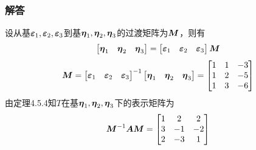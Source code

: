 \documentclass{beamer}
\begin{document}
\begin{frame}
    \frametitle{解答}
    设从基\(\boldsymbol{\varepsilon}_1,\boldsymbol{\varepsilon}_2,\boldsymbol{\varepsilon}_3\)到基\(\boldsymbol{\eta}_1,\boldsymbol{\eta}_2,\boldsymbol{\eta}_3\)的过渡矩阵为\(\boldsymbol{M}\)，则有
    \begin{equation*}
        \begin{bmatrix}\boldsymbol{\eta}_1&\boldsymbol{\eta}_2&\boldsymbol{\eta}_3\end{bmatrix}=
        \begin{bmatrix}\boldsymbol{\varepsilon}_1&\boldsymbol{\varepsilon}_2&\boldsymbol{\varepsilon}_3\end{bmatrix}\boldsymbol{M}
    \end{equation*}
    \begin{equation*}
        \boldsymbol{M}={\begin{bmatrix}\boldsymbol{\varepsilon}_1&\boldsymbol{\varepsilon}_2&\boldsymbol{\varepsilon}_3\end{bmatrix}}^{-1}\begin{bmatrix}\boldsymbol{\eta}_1&\boldsymbol{\eta}_2&\boldsymbol{\eta}_3\end{bmatrix}=
        \begin{bmatrix}
            1 & 1 & -3 \\
            1 & 2 & -5 \\
            1 & 3 & -6
        \end{bmatrix}
    \end{equation*}
    由定理4.5.4知\(T\)在基\(\boldsymbol{\eta}_1,\boldsymbol{\eta}_2,\boldsymbol{\eta}_3\)下的表示矩阵为
    \begin{equation*}
        {\boldsymbol{M}}^{-1}\boldsymbol{A}\boldsymbol{M}=
        \begin{bmatrix}
            1 & 2  & 2  \\
            3 & -1 & -2 \\
            2 & -3 & 1
        \end{bmatrix}
    \end{equation*}
\end{frame}
\end{document}
